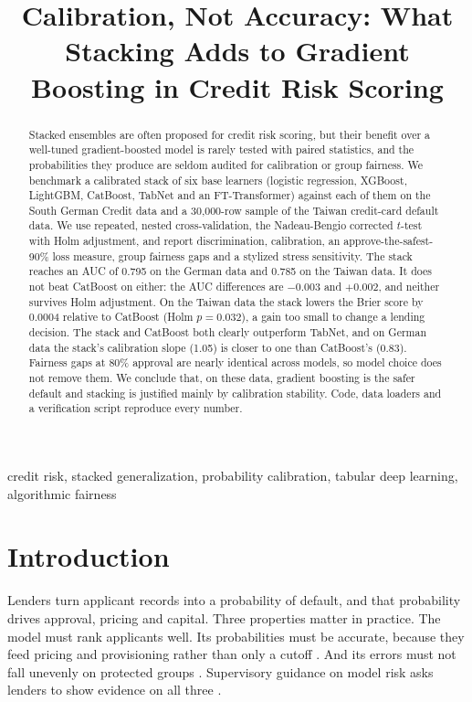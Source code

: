 
\title{Calibration, Not Accuracy: What Stacking Adds to Gradient Boosting in Credit Risk Scoring}

\maketitle
\begin{abstract}
Stacked ensembles are often proposed for credit risk scoring, but their benefit over a well-tuned gradient-boosted model is rarely tested with paired statistics, and the probabilities they produce are seldom audited for calibration or group fairness. We benchmark a calibrated stack of six base learners (logistic regression, XGBoost, LightGBM, CatBoost, TabNet and an FT-Transformer) against each of them on the South German Credit data and a 30,000-row sample of the Taiwan credit-card default data. We use repeated, nested cross-validation, the Nadeau-Bengio corrected $t$-test with Holm adjustment, and report discrimination, calibration, an approve-the-safest-90\% loss measure, group fairness gaps and a stylized stress sensitivity. The stack reaches an AUC of 0.795 on the German data and 0.785 on the Taiwan data. It does not beat CatBoost on either: the AUC differences are $-0.003$ and $+0.002$, and neither survives Holm adjustment. On the Taiwan data the stack lowers the Brier score by 0.0004 relative to CatBoost (Holm $p=0.032$), a gain too small to change a lending decision. The stack and CatBoost both clearly outperform TabNet, and on German data the stack's calibration slope (1.05) is closer to one than CatBoost's (0.83). Fairness gaps at 80\% approval are nearly identical across models, so model choice does not remove them. We conclude that, on these data, gradient boosting is the safer default and stacking is justified mainly by calibration stability. Code, data loaders and a verification script reproduce every number.
\end{abstract}
\begin{IEEEkeywords}
credit risk, stacked generalization, probability calibration, tabular deep learning, algorithmic fairness
\end{IEEEkeywords}

\section{Introduction}
Lenders turn applicant records into a probability of default, and that probability drives approval, pricing and capital. Three properties matter in practice. The model must rank applicants well. Its probabilities must be accurate, because they feed pricing and provisioning rather than only a cutoff \cite{vancalster,r28}. And its errors must not fall unevenly on protected groups \cite{hardt,kozodoi}. Supervisory guidance on model risk asks lenders to show evidence on all three \cite{r19,r20}.

